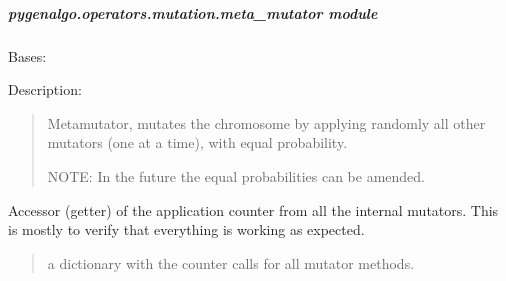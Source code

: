 \documentclass[letterpaper,10pt,english]{sphinxmanual}
\begin{document}
\subparagraph{pygenalgo.operators.mutation.meta\_mutator module}
\label{\detokenize{pygenalgo.operators.mutation:module-pygenalgo.operators.mutation.meta_mutator}}\label{\detokenize{pygenalgo.operators.mutation:pygenalgo-operators-mutation-meta-mutator-module}}

\begin{fulllineitems}
\label{\detokenize{pygenalgo.operators.mutation:pygenalgo.operators.mutation.meta_mutator.MetaMutator}}
\pysigstartsignatures
\pysiglinewithargsret
{}
{}
{}
\pysigstopsignatures
\sphinxAtStartPar
Bases: {\hyperref[\detokenize{pygenalgo.operators.mutation:pygenalgo.operators.mutation.mutate_operator.MutationOperator}]{}}

\sphinxAtStartPar
Description:
\begin{quote}

\sphinxAtStartPar
Meta\sphinxhyphen{}mutator, mutates the chromosome by applying randomly
all other mutators (one at a time), with equal probability.

\sphinxAtStartPar
NOTE: In the future the equal probabilities can be amended.
\end{quote}

\begin{fulllineitems}
\label{\detokenize{pygenalgo.operators.mutation:pygenalgo.operators.mutation.meta_mutator.MetaMutator.all_counters}}
\pysigstartsignatures
\pysigline
{}
\pysigstopsignatures
\sphinxAtStartPar
Accessor (getter) of the application counter from all the internal mutators.
This is mostly to verify that everything is working as expected.
\begin{quote}\begin{description}
\sphinxAtStartPar
a dictionary with the counter calls for all mutator methods.


\end{description}
\end{quote}
\end{fulllineitems}
\end{fulllineitems}
\end{document}
